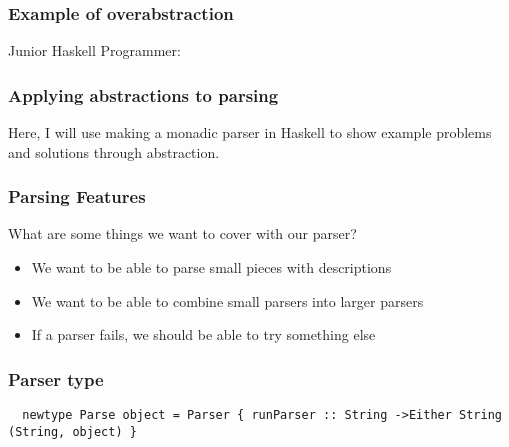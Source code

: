 \documentclass{beamer}
\begin{document}
\begin{frame}
\frametitle{Example of overabstraction}
Junior Haskell Programmer:










\end{frame}


\begin{frame}
\frametitle{Applying abstractions to parsing}
  Here, I will use making a monadic parser in Haskell 
  to show example problems and solutions through abstraction.
\end{frame}


\begin{frame}
\frametitle{Parsing Features}
  What are some things we want to cover with our parser?
  \begin{itemize}
    \item We want to be able to parse small pieces with descriptions
    \item We want to be able to combine small parsers into larger parsers
    \item If a parser fails, we should be able to try something else
  \end{itemize}
\end{frame}


\begin{frame}
\frametitle{Parser type}

\begin{lstlisting}
  newtype Parse object = Parser { runParser :: String ->Either String (String, object) }
\end{lstlisting}

\end{frame}
\end{document}
